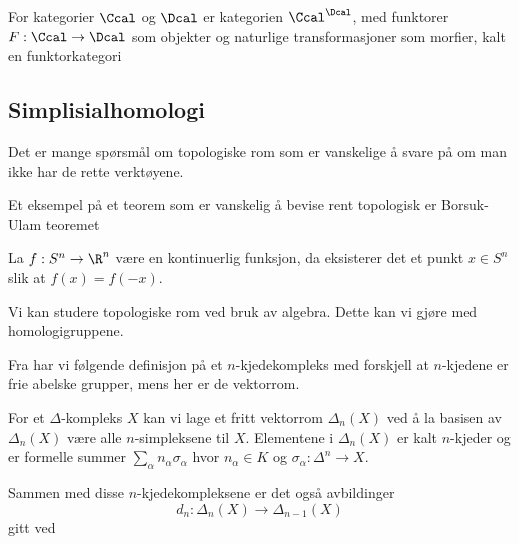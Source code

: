 \begin{definition}\label{Def:FunkKat}
    For kategorier $\Ccal$ og $\Dcal$ er kategorien $\Ccal^\Dcal$, med funktorer $F:\Ccal\to \Dcal$ som objekter og naturlige transformasjoner som morfier, kalt en funktorkategori
\end{definition}

\subsection{Simplisialhomologi}\label{Sec:Homologi}
Det er mange spørsmål om topologiske rom som er vanskelige å svare på om man ikke har de rette verktøyene.

Et eksempel på et teorem som er vanskelig å bevise rent topologisk er Borsuk-Ulam teoremet

\begin{theorem}\label{Thrm:BUtrm}
    La $f: S^n\to\R^n$ være en kontinuerlig funksjon, da eksisterer det et punkt $x\in S^n$ slik at $f(x)=f(-x)$.
\end{theorem}

Vi kan studere topologiske rom ved bruk av algebra. Dette kan vi gjøre med homologigruppene.

Fra \cite{Hatcher2002} har vi følgende definisjon på et $n$-kjedekompleks med forskjell at $n$-kjedene er frie abelske grupper, mens her er de vektorrom.
\begin{definition}\label{Def:label}
    For et $\Delta$-kompleks $X$ kan vi lage et fritt vektorrom $\Delta_n(X)$ ved å la basisen av $\Delta_n(X)$ være alle $n$-simpleksene til $X$. Elementene i $\Delta_n(X)$ er kalt $n$-kjeder og er formelle summer $\sum_\alpha n_\alpha\sigma_\alpha$ hvor $n_\alpha\in K$ og $\sigma_\alpha: \Delta^n\to X$.
\end{definition}
Sammen med disse $n$-kjedekompleksene er det også avbildinger
\[d_n: \Delta_n(X)\to\Delta_{n-1}(X)\]
gitt ved 
